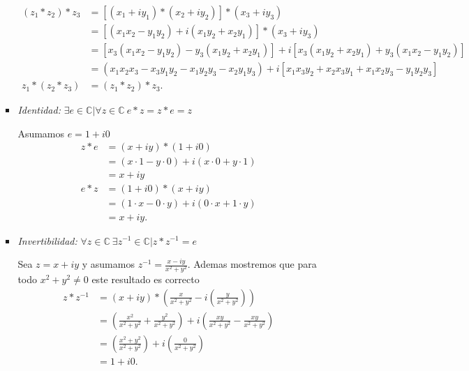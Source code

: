 \documentclass{report}
\begin{document}
\begin{enumerate}
\begin{itemize}
\begin{itemize}
\begin{align*}
	      \left( z_1*z_2 \right) * z_3 &= \left[ \left( x_1+iy_1 \right) * \left( x_2 + iy_2 \right)\right] * \left( x_3 + iy_3 \right)  \\
	      &= \left[ \left( x_1x_2 - y_1y_2 \right) + i \left( x_1y_2 + x_2y_1 \right)  \right] * \left( x_3 + i y_3 \right)   \\
	      &= \left[ x_3\left( x_1x_2-y_1y_2 \right) - y_3\left( x_1y_2 + x_2y_1 \right)  \right] + i \left[ x_3\left( x_1y_2+x_2y_1 \right) + y_3\left( x_1x_2-y_1y_2 \right)  \right]  \\
	      &= \left( x_1x_2x_3-x_3y_1y_2-x_1y_2y_3-x_2y_1y_3 \right) + i \left[ x_1x_3y_2+x_2x_3y_1 + x_1x_2y_3 - y_1y_2y_3 \right]  \\
	      z_1*\left( z_2*z_{3} \right) &= \left( z_1*z_2 \right) * z_3
	    .\end{align*}
	  \item \textit{Identidad:} $\exists e \in \mathbb{C} | \forall z \in \mathbb{C}\ e * z = z * e = z$

	    Asumamos $e = 1 + i0$
	    \begin{align*}
	      z * e &= \left( x + i y \right) * \left( 1 + i 0 \right)  \\
	      &= \left( x\cdot 1 - y\cdot 0 \right) + i \left( x\cdot 0 + y\cdot 1 \right)  \\
	      &= x + iy \\
	      e * z &= \left( 1 + i0 \right) * \left( x + iy \right)   \\
	      &= \left( 1\cdot x - 0\cdot y \right) + i \left( 0\cdot x + 1\cdot y\right)  \\
	      &= x + i y
	    .\end{align*}
	  \item \textit{Invertibilidad:} $\forall z \in \mathbb{C}\ \exists z^{-1}\in\mathbb{C} | z * z^{-1}=e$

	    Sea $z=x+iy$ y asumamos $z^{-1}=\frac{x-iy}{x^2+y^2}$. Ademas mostremos que para todo $x^2+y^2 \neq 0$ este resultado es correcto
	    \begin{align*}
	      z * z^{-1} &= \left( x + iy \right) * \left( \frac{x}{x^2+y^2}-i\left( \frac{y}{x^2+y^2} \right)  \right)  \\
	      &= \left( \frac{x^2}{x^2+y^2}+\frac{y^2}{x^2+y^2} \right) + i \left( \frac{xy}{x^2+y^2} - \frac{xy}{x^2+y^2} \right)   \\
	      &= \left( \frac{x^2 + y^2}{x^2 + y^2} \right) + i \left( \frac{0}{x^2+y^2} \right)  \\
	      &= 1 + i 0
	    .\end{align*}


\end{itemize}
\end{itemize}
\end{enumerate}
\end{document}
